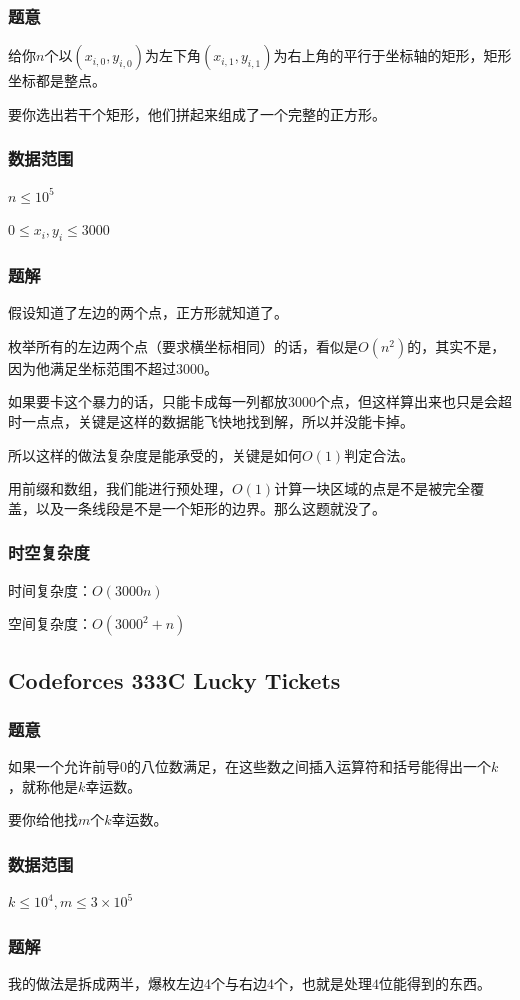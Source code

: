 \documentclass{ctexart}
\begin{document}
\subsubsection{题意}
给你$n$个以$(x_{i,0},y_{i,0})$为左下角$(x_{i,1},y_{i,1})$为右上角的平行于坐标轴的矩形，矩形坐标都是整点。

要你选出若干个矩形，他们拼起来组成了一个完整的正方形。
\subsubsection{数据范围}
$n \le 10^5$

$0 \le x_i,y_i \le 3000$
\subsubsection{题解}
假设知道了左边的两个点，正方形就知道了。

枚举所有的左边两个点（要求横坐标相同）的话，看似是$O(n^2)$的，其实不是，因为他满足坐标范围不超过$3000$。

如果要卡这个暴力的话，只能卡成每一列都放$3000$个点，但这样算出来也只是会超时一点点，关键是这样的数据能飞快地找到解，所以并没能卡掉。

所以这样的做法复杂度是能承受的，关键是如何$O(1)$判定合法。

用前缀和数组，我们能进行预处理，$O(1)$计算一块区域的点是不是被完全覆盖，以及一条线段是不是一个矩形的边界。那么这题就没了。
\subsubsection{时空复杂度}
时间复杂度：$O(3000n)$

空间复杂度：$O(3000^2+n)$
\subsection{Codeforces 333C Lucky Tickets}
\subsubsection{题意}
如果一个允许前导$0$的八位数满足，在这些数之间插入运算符和括号能得出一个$k$，就称他是$k$幸运数。

要你给他找$m$个$k$幸运数。
\subsubsection{数据范围}
$k \le 10^4,m \le 3 \times 10^5$
\subsubsection{题解}
我的做法是拆成两半，爆枚左边$4$个与右边$4$个，也就是处理$4$位能得到的东西。
\end{document}
